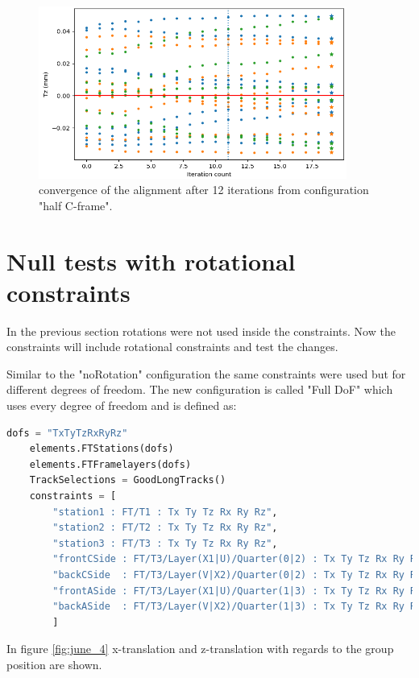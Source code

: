 \begin{figure}
  \centering
  \includegraphics[width=0.9\textwidth]{plots/scatter_fig_4_4_convergence.png}
  \caption{convergence of the alignment after 12 iterations from configuration "half C-frame".}
  \label{fig:conv}
\end{figure}

\section{Null tests with rotational constraints}
In the previous section rotations were not used inside the constraints. Now the constraints will include rotational constraints and test the changes.

Similar to the "noRotation" configuration the same constraints were used but for different degrees of freedom. The new configuration is called "Full DoF" which uses every degree of freedom and is defined as:

\begin{lstlisting}[language=Python]
    dofs = "TxTyTzRxRyRz"
    elements.FTStations(dofs)
    elements.FTFramelayers(dofs)
    TrackSelections = GoodLongTracks()
    constraints = [
        "station1 : FT/T1 : Tx Ty Tz Rx Ry Rz",
        "station2 : FT/T2 : Tx Ty Tz Rx Ry Rz",
        "station3 : FT/T3 : Tx Ty Tz Rx Ry Rz",
        "frontCSide : FT/T3/Layer(X1|U)/Quarter(0|2) : Tx Ty Tz Rx Ry Rz",
        "backCSide  : FT/T3/Layer(V|X2)/Quarter(0|2) : Tx Ty Tz Rx Ry Rz",
        "frontASide : FT/T3/Layer(X1|U)/Quarter(1|3) : Tx Ty Tz Rx Ry Rz",
        "backASide  : FT/T3/Layer(V|X2)/Quarter(1|3) : Tx Ty Tz Rx Ry Rz"
        ]
\end{lstlisting}

In figure \ref{fig:june_4} x-translation and z-translation with regards to the group position are shown.

